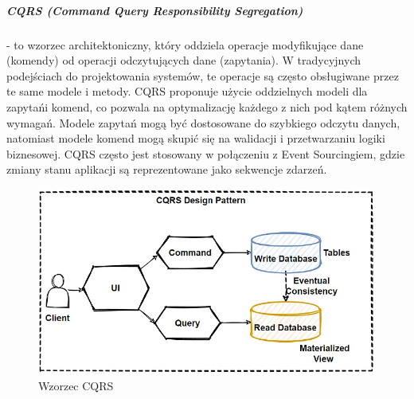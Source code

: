 \subparagraph{CQRS (Command Query Responsibility Segregation)} - to wzorzec architektoniczny, który oddziela operacje modyfikujące dane (komendy) od operacji odczytujących dane (zapytania). W tradycyjnych podejściach do projektowania systemów, te operacje są często obsługiwane przez te same modele i metody. CQRS proponuje użycie oddzielnych modeli dla zapytań\linebreak i komend, co pozwala na optymalizację każdego z nich pod kątem różnych wymagań. Modele zapytań mogą być dostosowane do szybkiego odczytu danych, natomiast modele komend mogą skupić się na walidacji i przetwarzaniu logiki biznesowej. CQRS często jest stosowany w połączeniu z Event Sourcingiem, gdzie zmiany stanu aplikacji są reprezentowane jako sekwencje zdarzeń.


\begin{figure}[H]
    \centering
    \includegraphics[width=1\linewidth]{Obrazy/cqrs.png}
    \caption{Wzorzec CQRS}
    \label{fig:enter-label}
\end{figure}


